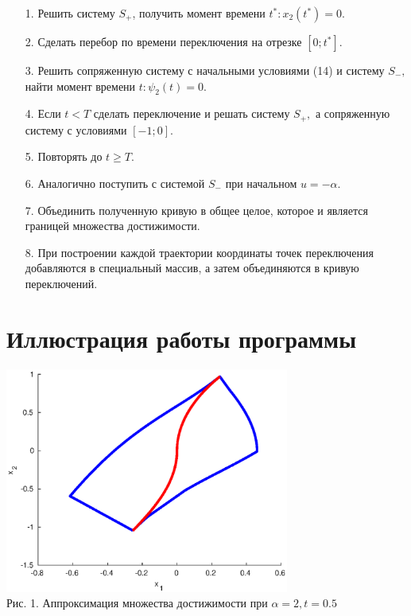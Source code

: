 \documentclass[11pt]{article}
\begin{document}
 	\begin{itemize}
 		\item [1.]{Решить систему $S_+$, получить момент времени $t^*: x_2(t^*) = 0.$}
 		\item [2.]{Сделать перебор по времени переключения на отрезке $[0;t^*]$.}
 		\item [3.]{Решить сопряженную систему с начальными условиями (14) и систему $S_-,$ найти момент времени $t:\psi_2(t) = 0.$}
 		\item [4.]{Если $t < T$ сделать переключение и решать систему $S_+,$ а сопряженную систему с условиями $[-1;0].$}
 		\item [5.]{Повторять до $t \geq T.$}
 		\item [6.]{Аналогично поступить с системой $S_-$ при начальном $u = -\alpha.$}
 		\item [7.]{Объединить полученную кривую в общее целое, которое и является границей множества достижимости. }
 		\item [8.]{При построении каждой траектории координаты точек переключения добавляются в специальный массив, а затем объединяются в кривую переключений.}
 	\end{itemize}
 	
 	\newpage
 	{\section{Иллюстрация работы программы}}
 	\begin{center}
 		\includegraphics[width=0.7\textwidth]{pic_1.eps}\\
 		{Рис. 1. Аппроксимация множества достижимости при $\alpha = 2, t = 0.5$ }
 	\end{center}
 
\end{document}

